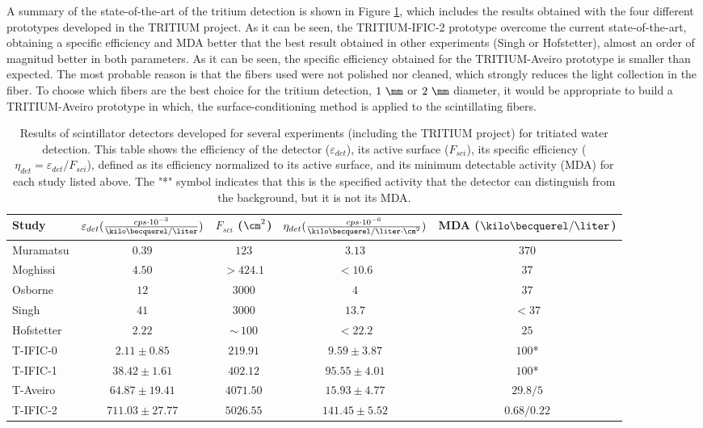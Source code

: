 \begin{enumerate}
\begin{itemize}
A summary of the state-of-the-art of the tritium detection is shown in Figure \ref{tab:ComparisonResultsTritium}, which includes the results obtained with the four different prototypes developed in the TRITIUM project. As it can be seen, the TRITIUM-IFIC-2 prototype overcome the current state-of-the-art, obtaining a specific efficiency and MDA better that the best result obtained in other experiments (Singh or Hofstetter), almost an order of magnitud better in both parameters. As it can be seen, the specific efficiency obtained for the TRITIUM-Aveiro prototype is smaller than expected. The most probable reason is that the fibers used were not polished nor cleaned, which strongly reduces the light collection in the fiber. To choose which fibers are the best choice for the tritium detection, $1~\mm$ or $2~\mm$ diameter, it would be appropriate to build a TRITIUM-Aveiro prototype in which, the surface-conditioning method is applied to the scintillating fibers.

\begin{table}[htbp]
\centering{}%
\begin{tabular}{lcccc}
\toprule 
Study & \parbox{5.5em}{$\varepsilon_{det}(\frac{cps \cdot{} 10^{-3}}{\kilo\becquerel/\liter})$}  & \parbox{4.5em}{$F_{sci}$ ($\cm^2$)}  & \parbox{6.5em}{$\eta_{det}(\frac{cps \cdot{} 10^{-6}}{\kilo\becquerel/ \liter \cdot{} \cm^2})$} & MDA ($\kilo\becquerel / \liter$) \tabularnewline
\midrule
\midrule 
Muramatsu & $0.39$ & $123$ & $3.13$ & $370$ \tabularnewline
Moghissi & $4.50$ & $>424.1$ & $<10.6$ & $37$ \tabularnewline
Osborne & $12$ & $3000$ & $4$ & $37$ \tabularnewline
Singh & $41$ & $3000$ & $13.7$ & $<37$ \tabularnewline
Hofstetter & $2.22$ & $\sim~100$ & $<22.2$ & $25$ \tabularnewline
T-IFIC-0 & $2.11 \pm 0.85$ & $219.91$ & $9.59 \pm 3.87$ & $100$* \tabularnewline
T-IFIC-1 & $38.42 \pm 1.61$ & $402.12$ & $95.55 \pm 4.01$ & $100$* \tabularnewline
T-Aveiro & $64.87 \pm 19.41$ & $4071.50$ & $15.93 \pm 4.77$ & $29.8/5$ \tabularnewline
T-IFIC-2 & $711.03 \pm 27.77$ & $5026.55$ & $141.45 \pm 5.52$ & $0.68/0.22$ \tabularnewline
\bottomrule
\end{tabular}
\caption{Results of scintillator detectors developed for several experiments (including the TRITIUM project) for tritiated water detection. This table shows the efficiency of the detector ($\varepsilon_{det}$), its active surface ($F_{sci}$), its specific efficiency ($\eta_{det}=\varepsilon_{det}/F_{sci}$), defined as its efficiency normalized to its active surface, and its minimum detectable activity (MDA) for each study listed above. The "*" symbol indicates that this is the specified activity that the detector can distinguish from the background, but it is not its MDA.}
\label{tab:ComparisonResultsTritium}
\end{table}


\end{itemize}
\end{enumerate}
